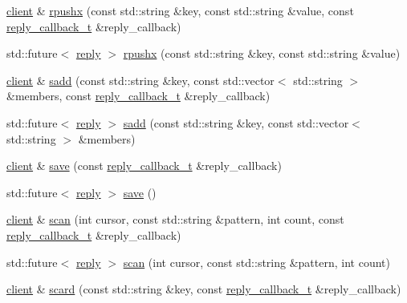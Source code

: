 \begin{DoxyCompactItemize}
\item 
\hyperlink{classcpp__redis_1_1client}{client} \& \hyperlink{classcpp__redis_1_1client_a051fdb76cf3d40bd7c0ea0dcb0eed36e}{rpushx} (const std\+::string \&key, const std\+::string \&value, const \hyperlink{classcpp__redis_1_1client_a061a1140d36d2eaeda82b09a0bb3f9f2}{reply\+\_\+callback\+\_\+t} \&reply\+\_\+callback)
\item 
std\+::future$<$ \hyperlink{classcpp__redis_1_1reply}{reply} $>$ \hyperlink{classcpp__redis_1_1client_a83d512f8f44f896383d050920634489f}{rpushx} (const std\+::string \&key, const std\+::string \&value)
\item 
\hyperlink{classcpp__redis_1_1client}{client} \& \hyperlink{classcpp__redis_1_1client_acf725ad7bc758599617ff166280f9622}{sadd} (const std\+::string \&key, const std\+::vector$<$ std\+::string $>$ \&members, const \hyperlink{classcpp__redis_1_1client_a061a1140d36d2eaeda82b09a0bb3f9f2}{reply\+\_\+callback\+\_\+t} \&reply\+\_\+callback)
\item 
std\+::future$<$ \hyperlink{classcpp__redis_1_1reply}{reply} $>$ \hyperlink{classcpp__redis_1_1client_a1a611fd2c5847d37973fed5d24f25fa1}{sadd} (const std\+::string \&key, const std\+::vector$<$ std\+::string $>$ \&members)
\item 
\hyperlink{classcpp__redis_1_1client}{client} \& \hyperlink{classcpp__redis_1_1client_a01987f9fb419cfbce81872be8cd17619}{save} (const \hyperlink{classcpp__redis_1_1client_a061a1140d36d2eaeda82b09a0bb3f9f2}{reply\+\_\+callback\+\_\+t} \&reply\+\_\+callback)
\item 
std\+::future$<$ \hyperlink{classcpp__redis_1_1reply}{reply} $>$ \hyperlink{classcpp__redis_1_1client_a40f28e53d89e46aff3df4670736b1034}{save} ()
\item 
\hyperlink{classcpp__redis_1_1client}{client} \& \hyperlink{classcpp__redis_1_1client_a3c4a8cc50f4e2152c7c79e876bf73294}{scan} (int cursor, const std\+::string \&pattern, int count, const \hyperlink{classcpp__redis_1_1client_a061a1140d36d2eaeda82b09a0bb3f9f2}{reply\+\_\+callback\+\_\+t} \&reply\+\_\+callback)
\item 
std\+::future$<$ \hyperlink{classcpp__redis_1_1reply}{reply} $>$ \hyperlink{classcpp__redis_1_1client_a847910b59d8c89acf37190f1b7e384ec}{scan} (int cursor, const std\+::string \&pattern, int count)
\item 
\hyperlink{classcpp__redis_1_1client}{client} \& \hyperlink{classcpp__redis_1_1client_a4be40b061ee915a236218e5e2fd76206}{scard} (const std\+::string \&key, const \hyperlink{classcpp__redis_1_1client_a061a1140d36d2eaeda82b09a0bb3f9f2}{reply\+\_\+callback\+\_\+t} \&reply\+\_\+callback)

\end{DoxyCompactItemize}
